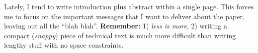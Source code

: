 \begin{remark} 
Lately, I tend to write introduction plus abstract within a single page. This forces me to focus on the important messages that I want to deliver about the paper, leaving out all the ``blah blah''. \textbf{Remember:} 1) {\it less is more}, 2) writing a compact ({\it snappy}) piece of technical text is much more difficult than writing lengthy stuff with no space constraints.
\end{remark}
